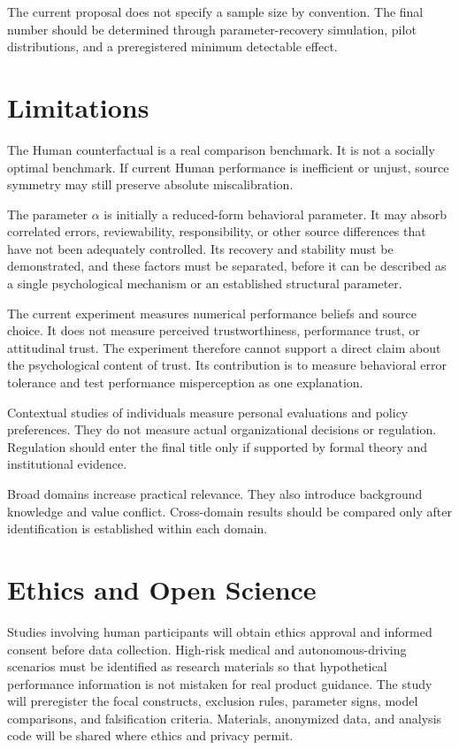 \documentclass[11pt,a4paper]{article}
\begin{document}
The current proposal does not specify a sample size by convention. The final number should be determined through parameter-recovery simulation, pilot distributions, and a preregistered minimum detectable effect.

\section{Limitations}

The Human counterfactual is a real comparison benchmark. It is not a socially optimal benchmark. If current Human performance is inefficient or unjust, source symmetry may still preserve absolute miscalibration.

The parameter $\alpha$ is initially a reduced-form behavioral parameter. It may absorb correlated errors, reviewability, responsibility, or other source differences that have not been adequately controlled. Its recovery and stability must be demonstrated, and these factors must be separated, before it can be described as a single psychological mechanism or an established structural parameter.

The current experiment measures numerical performance beliefs and source choice. It does not measure perceived trustworthiness, performance trust, or attitudinal trust. The experiment therefore cannot support a direct claim about the psychological content of trust. Its contribution is to measure behavioral error tolerance and test performance misperception as one explanation.

Contextual studies of individuals measure personal evaluations and policy preferences. They do not measure actual organizational decisions or regulation. Regulation should enter the final title only if supported by formal theory and institutional evidence.

Broad domains increase practical relevance. They also introduce background knowledge and value conflict. Cross-domain results should be compared only after identification is established within each domain.

\section{Ethics and Open Science}

Studies involving human participants will obtain ethics approval and informed consent before data collection. High-risk medical and autonomous-driving scenarios must be identified as research materials so that hypothetical performance information is not mistaken for real product guidance. The study will preregister the focal constructs, exclusion rules, parameter signs, model comparisons, and falsification criteria. Materials, anonymized data, and analysis code will be shared where ethics and privacy permit.
\end{document}
